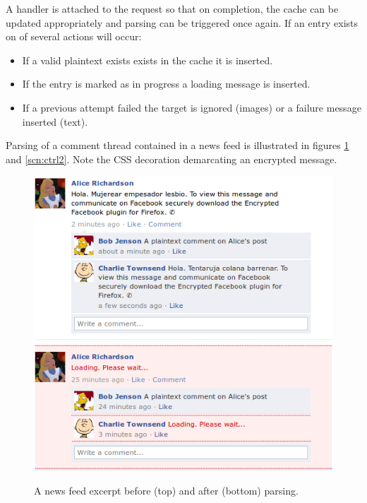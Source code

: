 A handler is attached to the request so that on completion, the cache can be updated appropriately and parsing can be triggered once again. If an entry exists on of several actions will occur:

\begin{itemize}
\item If a valid plaintext exists exists in the cache it is inserted.

\item If the entry is marked as in progress a loading message is inserted.

\item If a previous attempt failed the target is ignored (images) or a failure message inserted (text).
\end{itemize}

Parsing of a comment thread contained in a news feed is illustrated in figures \ref{scn:ctrl} and \ref{scn:ctrl2}. Note the CSS decoration demarcating an encrypted message.

    \begin{figure}[tbph]
        \begin{center}
                \includegraphics[width=12cm]{screens/content1.png}
                \includegraphics[width=12cm]{screens/content4.png}
            \caption{A news feed excerpt before (top) and after (bottom) parsing.}
            \label{scn:ctrl}
        \end{center}
    \end{figure}
    
